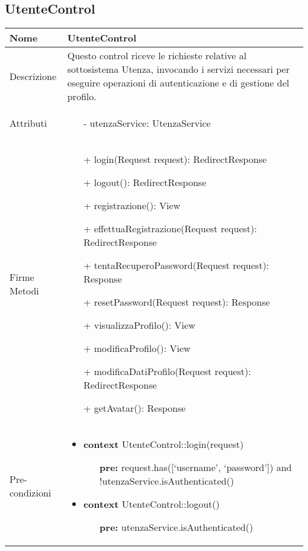 \subsection{UtenteControl}
\small\begin{tabular}{|| l | p{28em} ||} 
	\hline
	Nome & UtenteControl\\
	\hline
	Descrizione & Questo control riceve le richieste relative al sottosistema Utenza, invocando i servizi necessari per eseguire operazioni di autenticazione e di gestione del profilo. \\
	\hline
	Attributi & \begin{itemize}
		\item[-] utenzaService: UtenzaService
	\end{itemize}\\
	\hline
	Firme Metodi & \begin{itemize}
		\item[+] login(Request request): RedirectResponse
		\item[+] logout(): RedirectResponse
		\item[+] registrazione(): View
		\item[+] effettuaRegistrazione(Request request): RedirectResponse 
		\item[+] tentaRecuperoPassword(Request request): Response
		\item[+] resetPassword(Request request): Response
		\item[+] visualizzaProfilo(): View
		\item[+] modificaProfilo(): View
		\item[+] modificaDatiProfilo(Request request): RedirectResponse
		\item[+] getAvatar(): Response 
	\end{itemize}\\
	\hline
	Pre-condizioni & \begin{itemize}
		\item \textbf{context} UtenteControl::login(request)
		\begin{itemize}
			\item[ ] \textbf{pre:} request.has([‘username’, ‘password’]) and !utenzaService.isAuthenticated()
		\end{itemize}
	  
	    \item \textbf{context} UtenteControl::logout()
		\begin{itemize}
			\item[ ] \textbf{pre:} utenzaService.isAuthenticated()
		\end{itemize} 
	  

\end{itemize}
\end{tabular}
